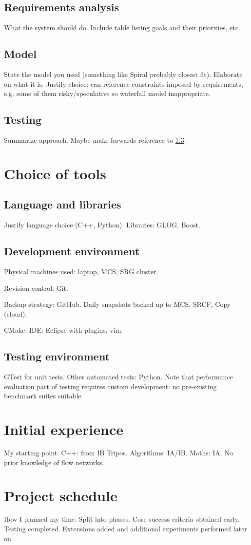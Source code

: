 \subsection{Requirements analysis} \label{sec:prep-sweng-requirements}
What the system should do. Include table listing goals and their priorities, etc.

\subsection{Model}
State the model you used (something like Spiral probably closest fit). Elaborate on what it is. Justify choice: can reference constraints imposed by requirements, e.g. some of them risky/speculative so waterfall model inappropriate.

\subsection{Testing}
Summarize approach. Maybe make forwards reference to \ref{sec:prep-tools-testing}.

\section{Choice of tools} \label{sec:prep-tool-choice}
\subsection{Language and libraries}
Justify language choice (C++, Python). Libraries: GLOG, Boost.

\subsection{Development environment}
Physical machines used: laptop, MCS, SRG cluster.

Revision control: Git.

Backup strategy: GitHub. Daily snapshots backed up to MCS, SRCF, Copy (cloud).

CMake. IDE: Eclipse with plugins, vim.

\subsection{Testing environment} \label{sec:prep-tools-testing}
GTest for unit tests. Other automated tests: Python. Note that performance evaluation part of testing requires custom development: no pre-existing benchmark suites suitable.

\section{Initial experience}
My starting point. C++: from IB Tripos. Algorithms: IA/IB. Maths: IA. No prior knowledge of flow networks.

\section{Project schedule} \label{sec:prep-project-schedule}
How I planned my time. Split into phases. Core success criteria obtained early. Testing completed. Extensions added and additional experiments performed later on.